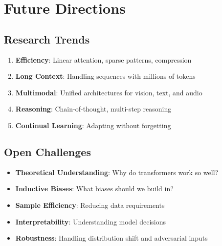 
\section{Future Directions}

\subsection{Research Trends}

\begin{enumerate}
    \item \textbf{Efficiency}: Linear attention, sparse patterns, compression
    \item \textbf{Long Context}: Handling sequences with millions of tokens
    \item \textbf{Multimodal}: Unified architectures for vision, text, and audio
    \item \textbf{Reasoning}: Chain-of-thought, multi-step reasoning
    \item \textbf{Continual Learning}: Adapting without forgetting
\end{enumerate}

\subsection{Open Challenges}

\begin{itemize}
    \item \textbf{Theoretical Understanding}: Why do transformers work so well?
    \item \textbf{Inductive Biases}: What biases should we build in?
    \item \textbf{Sample Efficiency}: Reducing data requirements
    \item \textbf{Interpretability}: Understanding model decisions
    \item \textbf{Robustness}: Handling distribution shift and adversarial inputs
\end{itemize}


